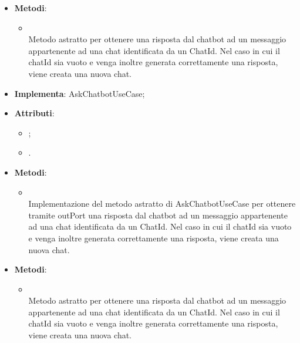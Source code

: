 \documentclass[10pt, a4paper]{article}
\begin{document}
\label{AskChatbotPortDettaglio}
\begin{itemize}
    \item \textbf{Metodi}:
    \begin{itemize}
        \item {}\\
        Metodo astratto per ottenere una risposta dal chatbot ad un messaggio appartenente ad una chat identificata da un ChatId. Nel caso in cui il chatId sia vuoto e venga inoltre generata correttamente una risposta, viene creata una nuova chat.
    \end{itemize}
\end{itemize}

\label{AskChatbotServiceDettaglio}
\begin{itemize}
    \item \textbf{Implementa}: AskChatbotUseCase;
    \item \textbf{Attributi}:
    \begin{itemize}
        \item {};
        \item {}.
    \end{itemize}
    \item \textbf{Metodi}:
    \begin{itemize}
        \item {}\\
        Implementazione del metodo astratto di AskChatbotUseCase per ottenere tramite outPort una risposta dal chatbot ad un messaggio appartenente ad una chat identificata da un ChatId. Nel caso in cui il chatId sia vuoto e venga inoltre generata correttamente una risposta, viene creata una nuova chat.
    \end{itemize}
\end{itemize}

\label{AskChatbotUseCaseDettaglio}
\begin{itemize}
    \item \textbf{Metodi}:
    \begin{itemize}
        \item {}\\
        Metodo astratto per ottenere una risposta dal chatbot ad un messaggio appartenente ad una chat identificata da un ChatId. Nel caso in cui il chatId sia vuoto e venga inoltre generata correttamente una risposta, viene creata una nuova chat.
    \end{itemize}
\end{itemize}
\end{document}
